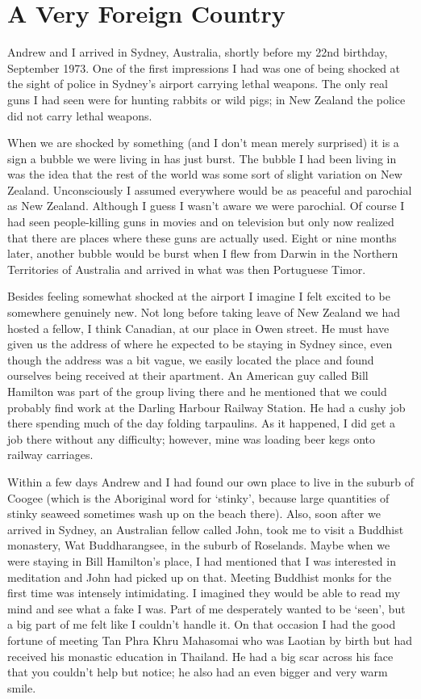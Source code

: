 \chapter{A Very Foreign Country}

Andrew and I arrived in Sydney, Australia, shortly before my 22nd
birthday, September 1973. One of the first impressions I had was one of
being shocked at the sight of police in Sydney's airport carrying lethal
weapons. The only real guns I had seen were for hunting rabbits or wild
pigs; in New Zealand the police did not carry lethal weapons.

When we are shocked by something (and I don't mean merely surprised) it
is a sign a bubble we were living in has just burst. The bubble I had
been living in was the idea that the rest of the world was some sort of
slight variation on New Zealand. Unconsciously I assumed everywhere
would be as peaceful and parochial as New Zealand. Although I guess I
wasn't aware we were parochial. Of course I had seen people-killing guns
in movies and on television but only now realized that there are places
where these guns are actually used. Eight or nine months later, another
bubble would be burst when I flew from Darwin in the Northern
Territories of Australia and arrived in what was then Portuguese Timor.

Besides feeling somewhat shocked at the airport I imagine I felt excited
to be somewhere genuinely new. Not long before taking leave of New
Zealand we had hosted a fellow, I think Canadian, at our place in Owen
street. He must have given us the address of where he expected to be
staying in Sydney since, even though the address was a bit vague, we
easily located the place and found ourselves being received at their
apartment. An American guy called Bill Hamilton was part of the group
living there and he mentioned that we could probably find work at the
Darling Harbour Railway Station. He had a cushy job there spending much
of the day folding tarpaulins. As it happened, I did get a job there
without any difficulty; however, mine was loading beer kegs onto railway
carriages.

Within a few days Andrew and I had found our own place to live in the
suburb of Coogee (which is the Aboriginal word for `stinky', because
large quantities of stinky seaweed sometimes wash up on the beach
there). Also, soon after we arrived in Sydney, an Australian fellow
called John, took me to visit a Buddhist monastery, Wat Buddharangsee,
in the suburb of Roselands. Maybe when we were staying in Bill
Hamilton's place, I had mentioned that I was interested in meditation
and John had picked up on that. Meeting Buddhist monks for the first
time was intensely intimidating. I imagined they would be able to read
my mind and see what a fake I was. Part of me desperately wanted to be
`seen', but a big part of me felt like I couldn't handle it. On that
occasion I had the good fortune of meeting Tan Phra Khru Mahasomai who
was Laotian by birth but had received his monastic education in
Thailand. He had a big scar across his face that you couldn't help but
notice; he also had an even bigger and very warm smile.


